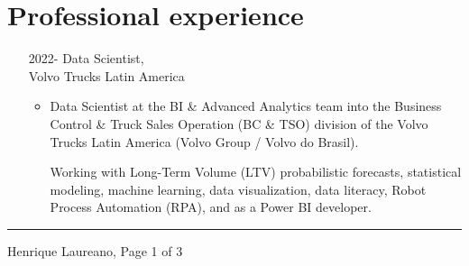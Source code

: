 \documentclass[12pt]{article}
\newcommand{\horrule}[1]{\noindent\rule{\linewidth}{#1}}
\begin{document}
\vspace{-0.5cm}
\section*{Professional experience}

\begin{itemize}
 \item[2022-] Data Scientist,\\
              Volvo Trucks Latin America
  \begin{itemize}
  \item Data Scientist at the BI \& Advanced Analytics team into the
        Business Control \& Truck Sales Operation (BC \& TSO) division
        of the Volvo Trucks Latin America (Volvo Group / Volvo do
        Brasil).
        
        Working with Long-Term Volume (LTV) probabilistic forecasts, statistical 
        modeling, machine learning, data visualization, data literacy, Robot 
        Process Automation (RPA), and as a Power BI developer.
  \end{itemize}
\end{itemize}

\vspace{\fill}
\horrule{1pt}
\noindent Henrique Laureano, \hfill Page 1 of 3
\end{document}
